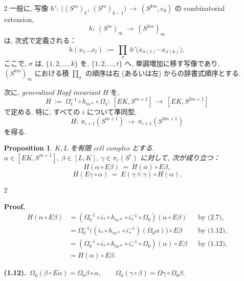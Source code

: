 \documentclass[10pt, leqno]{ltjsarticle} %
\numberwithin{equation}{section}
\theoremstyle{plain}
\newtheorem{proposition}[theorem]{Proposition}
\theoremstyle{definition}
\theoremstyle{remark}
\begin{document}
\begin{paracol}{2}
一般に, 写像
\(
h':\ \bigl((S^m)_k,\ (S^m)_{k-1}\bigr)\ \longrightarrow\ (S^{km},e_0)
\)
の combinatorial extension,
\[
h:\ (S^m)_\infty\ \longrightarrow\ (S^{km})_\infty
\]
は, 次式で定義される：
\[
h(x_1\ldots x_t)\ 
:=\ \prod_{\sigma}\ h'\!\bigl(x_{\sigma(1)}\cdots x_{\sigma(k)}\bigr),
\]
ここで, $\sigma$ は, 
$\{1,2,\ldots,k\}$ を, $\{1,2,\ldots,t\}$ へ, 
単調増加に移す写像であり,\\ 
$(S^{km})_\infty$ における積 
$\prod\nolimits_{\sigma}$ 
の順序は右 (あるいは左) からの辞書式順序とする. 

次に, \emph{generalized Hopf invariant} $H$ を,
\begin{equation}\label{eq:2.7}
H\ :=\ \Omega_1^{-1}\circ h_{m*}\circ \Omega_1:\ 
[EK, S^{m+1}]\ \longrightarrow\ [EK, S^{2m+1}]
\tag{2.7}
\end{equation}
で定める. 
特に, すべての $i$ について準同型,
\[
H:\ \pi_{i+1}(S^{m+1})\ \longrightarrow\ \pi_{i+1}(S^{2m+1})
\]
を得る. 

\begin{proposition}\label{prop:2.2}
$K,L$ を有限 cell complex とする. \\
$\alpha\in[EK, S^{m+1}], \ \beta\in[L,K], \ \gamma\in\pi_r(S^r)$ 
に対して, 次が成り立つ：\\
\[
H(\alpha\circ E\beta)\ =\ H(\alpha)\circ E\beta,
\]
\[
H(E\gamma\circ\alpha)\ =\ E(\gamma\wedge\gamma)\circ H(\alpha).
\]
\end{proposition}

  
\end{paracol}


\begin{paracol}{2}

\noindent
\textbf{Proof.}\
\begin{align*}
H(\alpha\circ E\beta) 
& = (\Omega_0^{-1}\circ i_{*}\circ h_{m*}\circ i_{*}^{-1}\circ \Omega_0)(\alpha\circ E\beta)
&& \text{by (2.7)},\\
& = \Omega_0^{-1}\!\bigl((i_*\circ h_{m*}\circ i_*^{-1})(\Omega_0\alpha)\bigr)\circ E\beta
&& \text{by (1.12)},\\
& = (\Omega_0^{-1}\circ i_*\circ h_{m*}\circ i_{*}^{-1}\circ\Omega_0)(\alpha)\circ E\beta
&& \text{by (1.12)},\\
& = H(\alpha)\circ E\beta .
\end{align*}

\switchcolumn

\noindent
\textbf{(1.12).}\
\(\Omega_0(\beta\circ E\alpha) = \Omega_0\beta\circ\alpha,\qquad
\Omega_0(\gamma\circ\beta) = \Omega\gamma \circ \Omega_0\beta .\)
  
\end{paracol}
\end{document}
